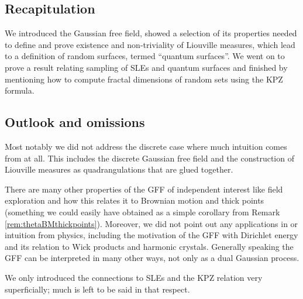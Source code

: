 \documentclass[11pt,reqno]{amsart}
\numberwithin{equation}{section}
\begin{document}
\subsection*{Recapitulation} We introduced the Gaussian free field, showed a selection of its properties needed to define and prove existence and non-triviality of Liouville measures, which lead to a definition of random surfaces, termed ``quantum surfaces''. We went on to prove a result relating sampling of SLEs and quantum surfaces and finished by mentioning how to compute fractal dimensions of random sets using the KPZ formula.

\subsection*{Outlook and omissions} Most notably we did not address the discrete case where much intuition comes from at all. This includes the discrete Gaussian free field and the construction of Liouville measures as quadrangulations that are glued together.

There are many other properties of the GFF of independent interest like field exploration and how this relates it to Brownian motion and thick points (something we could easily have obtained as a simple corollary from Remark \ref{rem:thetaBMthickpoints}).
Moreover, we did not point out any applications in or intuition from physics, including the motivation of the GFF with Dirichlet energy and its relation to Wick products and harmonic crystals. Generally speaking the GFF can be interpreted in many other ways, not only as a dual Gaussian process.



We only introduced the connections to SLEs and the KPZ relation very superficially; much is left to be said in that respect.


{}

\end{document}

